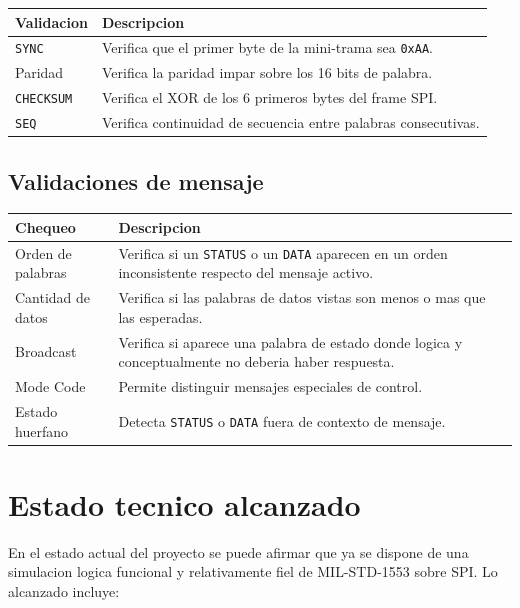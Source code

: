 \documentclass[12pt,a4paper]{article}
\begin{document}
\begin{longtable}{|>{\raggedright\arraybackslash}p{4.2cm}|>{\raggedright\arraybackslash}p{8.8cm}|}
\hline
\textbf{Validacion} & \textbf{Descripcion} \\
\hline
\texttt{SYNC} & Verifica que el primer byte de la mini-trama sea \texttt{0xAA}. \\
\hline
Paridad & Verifica la paridad impar sobre los 16 bits de palabra. \\
\hline
\texttt{CHECKSUM} & Verifica el XOR de los 6 primeros bytes del frame SPI. \\
\hline
\texttt{SEQ} & Verifica continuidad de secuencia entre palabras consecutivas. \\
\hline
\end{longtable}

\subsection{Validaciones de mensaje}

\begin{longtable}{|>{\raggedright\arraybackslash}p{4.2cm}|>{\raggedright\arraybackslash}p{8.8cm}|}
\hline
\textbf{Chequeo} & \textbf{Descripcion} \\
\hline
Orden de palabras & Verifica si un \texttt{STATUS} o un \texttt{DATA} aparecen en un orden inconsistente respecto del mensaje activo. \\
\hline
Cantidad de datos & Verifica si las palabras de datos vistas son menos o mas que las esperadas. \\
\hline
Broadcast & Verifica si aparece una palabra de estado donde logica y conceptualmente no deberia haber respuesta. \\
\hline
Mode Code & Permite distinguir mensajes especiales de control. \\
\hline
Estado huerfano & Detecta \texttt{STATUS} o \texttt{DATA} fuera de contexto de mensaje. \\
\hline
\end{longtable}

\section{Estado tecnico alcanzado}

En el estado actual del proyecto se puede afirmar que ya se dispone de una simulacion logica
funcional y relativamente fiel de MIL-STD-1553 sobre SPI. Lo alcanzado incluye:
\end{document}
